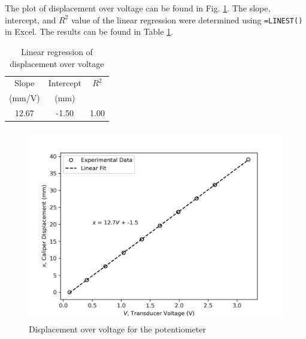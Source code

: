 \section{}


\subsection{}

The plot of displacement over voltage can be found in Fig. \ref{fig:Q1a}. The slope, intercept, and $R^2$ value of the linear regression 
were determined using \texttt{=LINEST()} in Excel. The results can be found in Table \ref{tab:Q1a}.

\begin{table}[h]
    \centering
    \caption{Linear regression of displacement over voltage}
    \label{tab:Q1a}
    \begin{tabular}{ccc}
        \hline
        Slope & Intercept & $R^2$ \\
        (mm/V) & (mm) & \\
        \midrule
        12.67 & -1.50 & 1.00 \\
        \hline
    \end{tabular}
\end{table}

\begin{figure}[h]
    \centering
    \includegraphics[width=0.8\linewidth]{matplotlib/Q1a.png}
    \caption{Displacement over voltage for the potentiometer}
    \label{fig:Q1a}
\end{figure}


